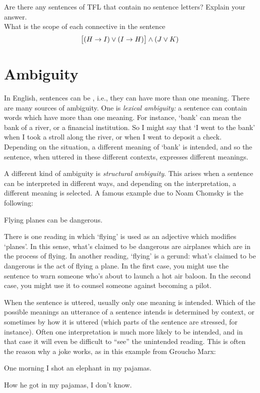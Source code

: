 \problempart
Are there any sentences of TFL that contain no sentence letters? Explain your answer.\\

\problempart
What is the scope of each connective in the sentence
$$\bigl[(H \rightarrow I) \vee (I \rightarrow H)\bigr] \wedge (J \vee K)$$

\chapter{Ambiguity}\label{s:AbmbiguityTFL}

In English, sentences can be , i.e., they can have more than one meaning.  There are many sources of ambiguity. One is \emph{lexical ambiguity:} a sentence can contain words which have more than one meaning.  For instance, `bank' can mean the bank of a river, or a financial institution. So I might say that `I went to the bank' when I took a stroll along the river, or when I went to deposit a check.  Depending on the situation, a different meaning of `bank' is intended, and so the sentence, when uttered in these different contexts, expresses different meanings.

A different kind of ambiguity is \emph{structural ambiguity}.  This arises when a sentence can be interpreted in different ways, and depending on the interpretation, a different meaning is selected.  A famous example due to Noam Chomsky is the following:
\begin{earg}
	\item[] Flying planes can be dangerous.
\end{earg}
There is one reading in which `flying' is used as an adjective which modifies `planes'. In this sense, what's claimed to be dangerous are airplanes which are in the process of flying.  In another reading, `flying' is a gerund: what's claimed to be dangerous is the act of flying a plane.  In the first case, you might use the sentence to warn someone who's about to launch a hot air baloon.  In the second case, you might use it to counsel someone against becoming a pilot.

When the sentence is uttered, usually only one meaning is intended. Which of the possible meanings an utterance of a sentence intends is determined by context, or sometimes by how it is uttered (which parts of the sentence are stressed, for instance). Often one interpretation is much more likely to be intended, and in that case it will even be difficult to ``see'' the unintended reading.  This is often the reason why a joke works, as in this example from Groucho Marx:
\begin{earg}
	\item[] One morning I shot an elephant in my pajamas.
	\item[] How he got in my pajamas, I don't know.
\end{earg}

